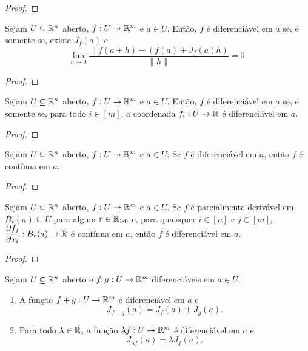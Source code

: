 \begin{proof}
    \blackproof
\end{proof}

\begin{corollary}
    Sejam $U \subseteq \mathbb{R}^n$ aberto, $f : U \to \mathbb{R}^m$ e $a \in U$. Então, $f$ é diferenciável em $a$ se, e somente se, existe $J_f(a)$ e
        \[
            \lim_{h \to 0} \dfrac{\| f(a+h) - (f(a) + J_f(a)h)}{\|h\|} = 0.
        \]
\end{corollary}

\begin{proof}
    \blackproof
\end{proof}

\begin{proposition}
    Sejam $U \subseteq \mathbb{R}^n$ aberto, $f : U \to \mathbb{R}^m$ e $a \in U$. Então, $f$ é diferenciável em $a$ se, e somente se, para todo $i \in [m]$, a coordenada $f_i : U \to \mathbb{R}$ é diferenciável em $a$.
\end{proposition}

\begin{proof}
    \blackproof
\end{proof}

\begin{proposition}
    Sejam $U \subseteq \mathbb{R}^n$ aberto, $f : U \to \mathbb{R}^m$ e $a \in U$. Se $f$ é diferenciável em $a$, então $f$ é contínua em $a$.
\end{proposition}

\begin{proof}
    \blackproof
\end{proof}

\begin{theorem}
    Sejam $U \subseteq \mathbb{R}^n$ aberto, $f : U \to \mathbb{R}^m$ e $a \in U$. Se $f$ é parcialmente derivável em $B_r(a) \subseteq U$ para algum $r \in \mathbb{R}_{>0}$ e, para quaisquer $i \in [n]$ e $j \in [m]$, $\dfrac{\partial f_j}{\partial x_i} : B_r(a) \to \mathbb{R}$ é contínua em $a$, então $f$ é diferenciável em $a$.
\end{theorem}

\begin{proof}
    \blackproof
\end{proof}

\begin{proposition}
    Sejam $U \subseteq \mathbb{R}^n$ aberto e $f,g : U \to \mathbb{R}^m$ diferenciáveis em $a \in U$.
        \begin{enumerate}[leftmargin=*, align=left, label=\textbf{(\alph*)}]
            \item A função $f + g : U \to \mathbb{R}^m$ é diferenciável em $a$ e
                \[
                    J_{f+g}(a) = J_f(a) + J_g(a).
                \]
            \item Para todo $\lambda \in \mathbb{R}$, a função $\lambda f : U \to \mathbb{R}^m$ é diferenciável em $a$ e
                \[
                    J_{\lambda f}(a) = \lambda J_f(a).
                \]
        \end{enumerate}
\end{proposition}

